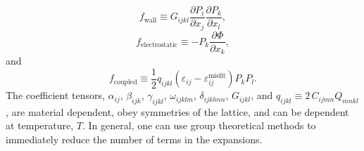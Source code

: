 \documentclass[16pt]{article} %
\begin{document}
%
\begin{equation}\tag{7}
f_\mathrm{wall} \equiv  G_{ijkl} \frac{\partial P_i}{\partial x_j} \frac{\partial P_k}{\partial x_l},
\end{equation}
%
\begin{equation}\tag{8}
f_\mathrm{electrostatic} \equiv - P_k \frac{\partial \Phi}{\partial x_k},
\end{equation}
%
and 
%
\begin{equation}\tag{9}
f_\mathrm{coupled} \equiv \frac{1}{2} q_{ijkl} \left(\varepsilon_{ij} - \varepsilon_{ij}^\mathrm{misfit} \right)P_k P_l.
\end{equation}
%
The coefficient tensors, $\alpha_{ij}$, $\beta_{ijk}$, $\gamma_{ijkl}$, $\omega_{ijklm}$, $\delta_{ijklmn}$, $G_{ijkl}$, and $q_{ijkl} \equiv 2 \, C_{ijmn} Q_{mnkl}$, are material dependent, obey symmetries of the lattice, and can be dependent at temperature, $T$.
%
In general, one can use group theoretical methods \cite{WootenBook} to immediately reduce the number of terms in the expansions.
%
\end{document}
